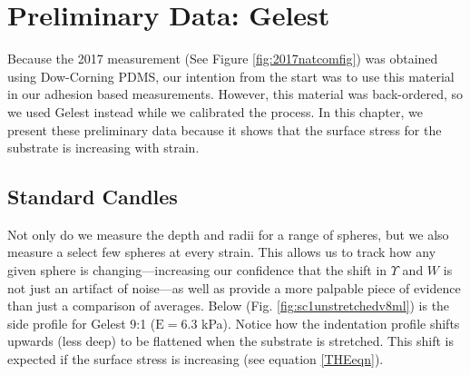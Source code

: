 \section{Preliminary Data: Gelest}
Because the 2017 measurement \cite{xu2017direct} (See Figure \ref{fig:2017natcomfig}) was obtained using Dow-Corning PDMS, our intention from the start was to use this material in our adhesion based measurements. However, this material was back-ordered, so we used Gelest instead while we calibrated the process. In this chapter, we present these preliminary data because it shows that the surface stress for the substrate is increasing with strain.  

\subsection{Standard Candles}
Not only do we measure the depth and radii for a range of spheres, but we also measure a select few spheres at every strain. This allows us to track how any given sphere is changing---increasing our confidence that the shift in $\Upsilon$ and $ W $ is not just an artifact of noise---as well as provide a more palpable piece of evidence than just a comparison of averages. Below (Fig. \ref{fig:sc1unstretchedv8ml}) is the side profile for Gelest 9:1 ($\text{E}=6.3$ kPa). Notice how the indentation profile shifts upwards (less deep) to be flattened when the substrate is stretched. This shift is expected if the surface stress is increasing (see equation \ref{THEeqn}).

